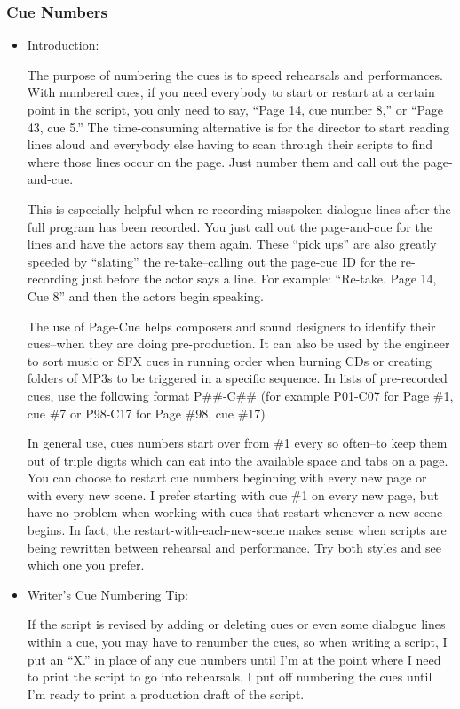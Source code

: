 \documentclass[openleft,oneside,showtrims]{memoir}
\begin{document}
\subsubsection*{Cue Numbers  }
\label{sec:orgb37c7af}
\begin{itemize}
\item Introduction:
\label{sec:org8c0bb07}

The purpose of numbering the cues is to speed rehearsals and performances. With numbered cues, if you need everybody to start or restart at a certain point in the script, you only need to say, ``Page 14, cue number 8,'' or ``Page 43, cue 5.'' The time-consuming alternative is for the director to start reading lines aloud and everybody else having to scan through their scripts to find where those lines occur on the page. Just number them and call out the page-and-cue.

This is especially helpful when re-recording misspoken dialogue lines after the full program has been recorded. You just call out the page-and-cue for the lines and have the actors say them again. These ``pick ups'' are also greatly speeded by ``slating'' the re-take--calling out the page-cue ID for the re-recording just before the actor says a line. For example: ``Re-take. Page 14, Cue 8'' and then the actors begin speaking.

The use of Page-Cue helps composers and sound designers to identify their cues--when they are doing pre-production. It can also be used by the engineer to sort music or SFX cues in running order when burning CDs or creating folders of MP3s to be triggered in a specific sequence. In lists of pre-recorded cues, use the following format P\#\#-C\#\# (for example P01-C07 for Page \#1, cue \#7 or P98-C17 for Page \#98, cue \#17)

In general use, cues numbers start over from \#1 every so often--to keep them out of triple digits which can eat into the available space and tabs on a page. You can choose to restart cue numbers beginning with every new page or with every new scene. I prefer starting with cue \#1 on every new page, but have no problem when working with cues that restart whenever a new scene begins. In fact, the restart-with-each-new-scene makes sense when scripts are being rewritten between rehearsal and performance. Try both styles and see which one you prefer.

\item Writer's Cue Numbering Tip:  
\label{sec:org2194ac3}

If the script is revised by adding or deleting cues or even some dialogue lines within a cue, you may have to renumber the cues, so when writing a script, I put an ``X.'' in place of any cue numbers until I'm at the point where I need to print the script to go into rehearsals. I put off numbering the cues until I'm ready to print a production draft of the script.


\end{itemize}
\end{document}
